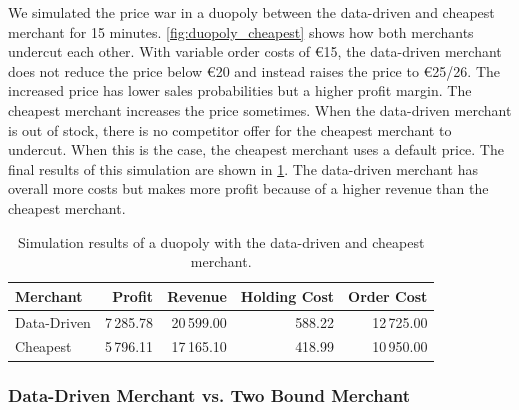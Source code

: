 We simulated the price war in a duopoly between the data-driven and cheapest merchant for 15 minutes.
\cref{fig:duopoly_cheapest} shows how both merchants undercut each other.
With variable order costs of €15, the data-driven merchant does not reduce the price below €20 and instead raises the price to €25/26.
The increased price has lower sales probabilities but a higher profit margin.
The cheapest merchant increases the price sometimes.
When the data-driven merchant is out of stock, there is no competitor offer for the cheapest merchant to undercut.
When this is the case, the cheapest merchant uses a default price.
The final results of this simulation are shown in \cref{tab:duopoly_cheapest}.
The data-driven merchant has overall more costs but makes more profit because of a higher revenue than the cheapest merchant.

\begin{table}[t]
	\centering
	\begin{tabular}{lrrrr}
		\toprule
		\textbf{Merchant} & \textbf{Profit} & \textbf{Revenue} & \textbf{Holding Cost} & \textbf{Order Cost} \\
		\midrule
		Data-Driven & 7\,285.78 & 20\,599.00 & 588.22 & 12\,725.00 \\
		Cheapest & 5\,796.11 & 17\,165.10 & 418.99 & 10\,950.00 \\
		\bottomrule
	\end{tabular}
	\caption{Simulation results of a duopoly with the data-driven and cheapest merchant.}
	\label{tab:duopoly_cheapest}
\end{table}

\subsubsection{Data-Driven Merchant vs. Two Bound Merchant}

